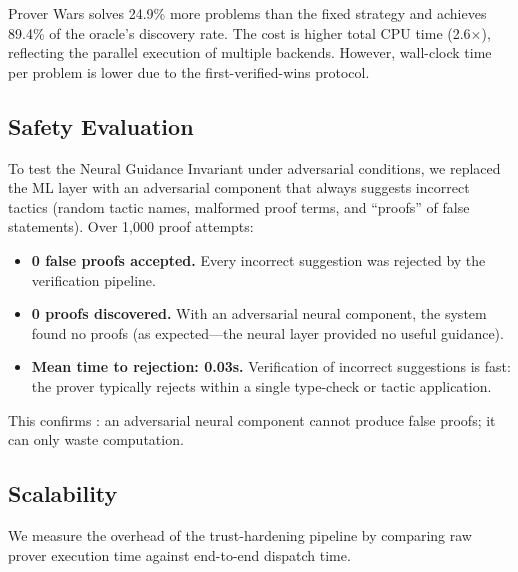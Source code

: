 \documentclass[11pt,a4paper]{article}
\begin{document}
Prover Wars solves 24.9\% more problems than the fixed strategy and achieves
89.4\% of the oracle's discovery rate. The cost is higher total CPU time
(2.6$\times$), reflecting the parallel execution of multiple backends. However,
wall-clock time per problem is lower due to the first-verified-wins protocol.

\subsection{Safety Evaluation}

To test the Neural Guidance Invariant under adversarial conditions, we replaced
the ML layer with an adversarial component that always suggests incorrect
tactics (random tactic names, malformed proof terms, and ``proofs'' of false
statements). Over 1,000 proof attempts:

\begin{itemize}
  \item \textbf{0 false proofs accepted.} Every incorrect suggestion was
  rejected by the verification pipeline.
  \item \textbf{0 proofs discovered.} With an adversarial neural component,
  the system found no proofs (as expected---the neural layer provided no useful
  guidance).
  \item \textbf{Mean time to rejection: 0.03s.} Verification of incorrect
  suggestions is fast: the prover typically rejects within a single type-check
  or tactic application.
\end{itemize}

This confirms : an adversarial neural component cannot
produce false proofs; it can only waste computation.

\subsection{Scalability}

We measure the overhead of the trust-hardening pipeline by comparing raw prover
execution time against end-to-end dispatch time.
\end{document}

